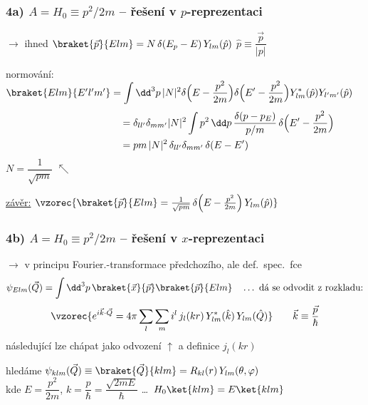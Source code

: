 \subsubsection*{4a) \underline{$A = H_0 \equiv p^2/2m$} -- řešení v $p$-reprezentaci}
$\to$ ihned \quad $\braket{\vec p}{Elm} = N\,\delta(E_p - E)\,Y_{lm}(\hat p)$ \qquad $\hat p \equiv \dfrac{\vec p}{|p|}$

normování: \quad $\braket{Elm}{E'l'm'} = \displaystyle\int\dd^3p\,|N|^2\delta\Big(E - \frac{p^2}{2m}\Big)\delta\Big(E' - \frac{p^2}{2m}\Big)Y_{lm}^*(\hat p)Y_{l'm'}(\hat p)$
\begin{align*}
  \hspace*{3cm} &= \delta_{ll'}\delta_{mm'}|N|^2\int p^2\,\dd p\,\frac{\delta(p - p_E)}{p/m}\,\delta\Big(E' - \frac{p^2}{2m}\Big) \\
  &= pm\,|N|^2\,\delta_{ll'}\delta_{mm'}\,\delta(E - E')
\end{align*}
\quad $N = \dfrac{1}{\sqrt{pm}}$  \quad $\nwarrow$

\underline{závěr:} \quad $\vzorec{\braket{\vec p}{Elm} = \frac{1}{\sqrt{pm}}\,\delta\Big(E - \frac{p^2}{2m}\Big)\,Y_{lm}(\hat p)}$

\subsubsection*{4b) \underline{$A = H_0 \equiv p^2/2m$} -- řešení v $x$-reprezentaci}
$\to$ v principu Fourier.-transformace předchozího, ale def.\ spec.\ fce
\[
  \psi_{Elm}(\vec Q) = \int\dd^3p\,\braket{\vec x}{\vec p}\braket{\vec p}{Elm}
  \quad\dots\ \text{dá se odvodit z rozkladu:}
\]
\[
  \vzorec{e^{i\vec k\cdot\vec Q} = 4\pi\sum_l\sum_m i^l\,j_l(kr)\,Y_{lm}^*(\hat k)\,Y_{lm}(\hat Q)}
  \qquad \vec k \equiv \frac{\vec p}{\hbar}
\]
následující lze chápat jako odvození $\uparrow$ a definice $j_l(kr)$

hledáme \quad $\psi_{klm}(\vec Q) \equiv \braket{\vec Q}{klm} = R_{kl}(r)\,Y_{lm}(\theta,\varphi)$ \\
\quad kde \quad $E = \dfrac{p^2}{2m}$, \quad $k = \dfrac{p}{\hbar} = \dfrac{\sqrt{2mE}}{\hbar}$ \quad \dots\ $H_0\ket{klm} = E\ket{klm}$

